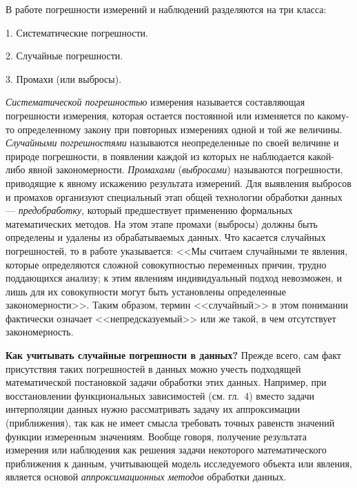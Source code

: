 \documentclass[a5paper,openany]{book}
\begin{document}
{{В работе \cite{Malikov} погрешности измерений и наблюдений разделяются на три класса: 
\begin{list}{}{\leftmargin=10mm\itemsep=5pt\topsep=3pt\parsep=0pt} 
	\item [1.] 
	Систематические погрешности. 
	\item[2.] 
	Случайные погрешности. 
	\item[3.] 
	Промахи (или выбросы).  
\end{list} 

\emph{Систематической погрешностью} измерения называется составляющая погрешности 
измерения, которая остается постоянной или изменяется по какому-то определенному 
закону при повторных измерениях одной и той же величины. \emph{Случайными погрешностями} 
называются неопределенные по своей величине и природе погрешности, в появлении каждой 
из которых не наблюдается какой-либо явной закономерности. 
\emph{Промахами} (\emph{выбросами}) называются погрешности, приводящие к явному 
искажению результата измерений. 
Для выявления выбросов и промахов организуют специальный этап общей технологии 
обработки данных --- \emph{предобработку}, который предшествует применению формальных 
математических методов. На этом этапе промахи (выбросы)   должны быть определены и удалены 
из обрабатываемых данных.                
Что касается случайных погрешностей, то в работе \cite{Malikov} указывается: <<Мы считаем случайными те явления, которые определяются сложной совокупностью переменных 
причин, трудно поддающихся анализу; к этим явлениям индивидуальный подход невозможен, 
и лишь для их совокупности могут быть установлены определенные закономерности>>. 
Таким образом, термин <<случайный>> в этом понимании  фактически означает
<<непредсказуемый>> или же такой, в чем  отсутствует закономерность. 

{\bf Как учитывать случайные погрешности в данных?}
Прежде всего, сам факт присутствия таких погрешностей в данных можно учесть подходящей 
математической постановкой задачи обработки этих данных. Например, при восстановлении 
функциональных зависимостей (см. гл.~4) вместо задачи интерполяции данных нужно 
рассматривать задачу их аппроксимации (приближения), так как не имеет смысла требовать 
точных равенств значений функции измеренным значениям. Вообще говоря, получение результата 
измерения или наблюдения как решения задачи некоторого математического приближения 
к данным, учитывающей модель исследуемого объекта или явления, является основой 
\emph{аппроксимационных методов}  
обработки данных.   

}}
\end{document}
